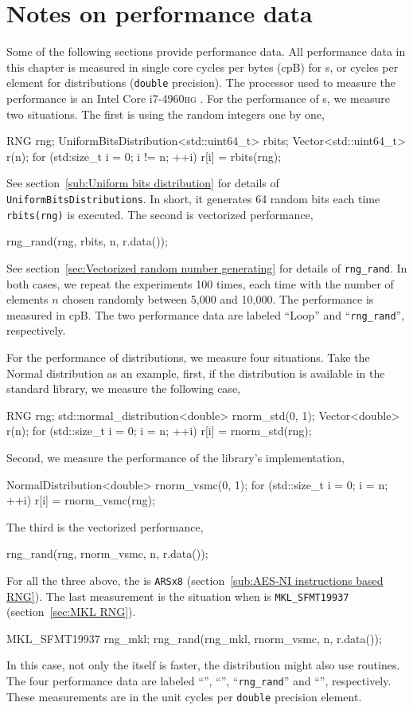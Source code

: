 \section{Notes on performance data}
\label{sec:Notes on performance data}

Some of the following sections provide performance data. All performance data
in this chapter is measured in single core cycles per bytes (cpB) for \rng{}s,
or cycles per element for distributions (\verb|double| precision). The
processor used to measure the performance is an Intel Core i7-4960\textsc{hg}
\cpu.
For the performance of \rng{}s, we measure two situations. The first is using
the random integers one by one,
\begin{cppcode}
  RNG rng;
  UniformBitsDistribution<std::uint64_t> rbits;
  Vector<std::uint64_t> r(n);
  for (std:size_t i = 0; i != n; ++i)
      r[i] = rbits(rng);
\end{cppcode}
See section~\ref{sub:Uniform bits distribution} for details of
\verb|UniformBitsDistributions|. In short, it generates 64 random bits each
time \verb|rbits(rng)| is executed. The second is vectorized performance,
\begin{cppcode}
  rng_rand(rng, rbits, n, r.data());
\end{cppcode}
See section~\ref{sec:Vectorized random number generating} for details of
\verb|rng_rand|. In both cases, we repeat the experiments 100 times, each time
with the number of elements $n$ chosen randomly between 5,000 and 10,000. The
performance is measured in cpB. The two performance data are labeled ``Loop''
and ``\verb|rng_rand|'', respectively.

For the performance of distributions, we measure four situations. Take the
Normal distribution as an example, first, if the distribution is available in
the standard library, we measure the following case,
\begin{cppcode}
  RNG rng;
  std::normal_distribution<double> rnorm_std(0, 1);
  Vector<double> r(n);
  for (std::size_t i = 0; i = n; ++i)
      r[i] = rnorm_std(rng);
\end{cppcode}
Second, we measure the performance of the \vsmc library's implementation,
\begin{cppcode}
  NormalDistribution<double> rnorm_vsmc(0, 1);
  for (std::size_t i = 0; i = n; ++i)
      r[i] = rnorm_vsmc(rng);
\end{cppcode}
The third is the vectorized performance,
\begin{cppcode}
  rng_rand(rng, rnorm_vsmc, n, r.data());
\end{cppcode}
For all the three above, the \rng is \verb|ARSx8| (section~\ref{sub:AES-NI
  instructions based RNG}). The last measurement is the situation when \rng is
\verb|MKL_SFMT19937| (section~\ref{sec:MKL RNG}).
\begin{cppcode}
  MKL_SFMT19937 rng_mkl;
  rng_rand(rng_mkl, rnorm_vsmc, n, r.data());
\end{cppcode}
In this case, not only the \rng itself is faster, the distribution might also
use \mkl routines. The four performance data are labeled ``\std'', ``\vsmc'',
``\verb|rng_rand|'' and ``\mkl'', respectively. These measurements are in the
unit cycles per \verb|double| precision element.

